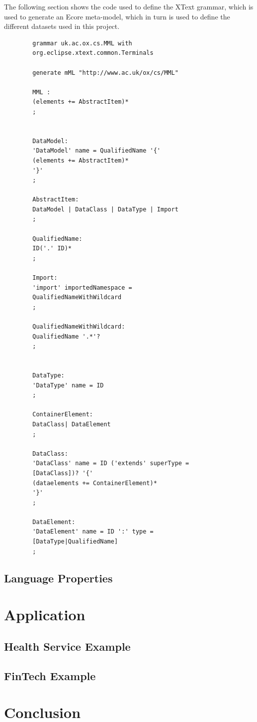 \documentclass{llncs}
\begin{document}
	The following section shows the code used to define the XText grammar, which is used to generate an Ecore meta-model, which in turn is used to define the different datasets used in this project.
	\begin{small}
		\begin{verbatim}
		grammar uk.ac.ox.cs.MML with 
		org.eclipse.xtext.common.Terminals
		
		generate mML "http://www.ac.uk/ox/cs/MML"
		
		MML :
		(elements += AbstractItem)*
		;
		
		
		DataModel:
		'DataModel' name = QualifiedName '{'
		(elements += AbstractItem)*
		'}'
		;
		
		AbstractItem:
		DataModel | DataClass | DataType | Import
		;
		
		QualifiedName:
		ID('.' ID)*
		;
		
		Import:
		'import' importedNamespace = 
		QualifiedNameWithWildcard
		;
		
		QualifiedNameWithWildcard:
		QualifiedName '.*'?
		;
		
		
		DataType:
		'DataType' name = ID
		;
		
		ContainerElement:
		DataClass| DataElement
		;
		
		DataClass:
		'DataClass' name = ID ('extends' superType =
		[DataClass])? '{'
		(dataelements += ContainerElement)*
		'}'
		;
		
		DataElement:
		'DataElement' name = ID ':' type =  
		[DataType|QualifiedName]
		;
		\end{verbatim}
	\end{small}
	
	
	
	\subsection{Language Properties}
	
	
	\section{Application}
	
	
	\subsection{Health Service Example}
	\subsection{FinTech Example}
	
	
	\section{Conclusion}
	
	
	
	
	
	
\end{document}
